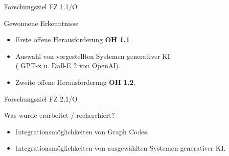 \documentclass[t]{beamer}
\begin{document}
\begin{frame}{Forschungsziel FZ 1.1/O}
  \begin{block}{Gewonnene Erkenntnisse}
    \begin{itemize}
      \item<+-> Erste offene Herausforderung \textbf{OH 1.1}.
      \item<+-> Auswahl von vorgestellten Systemen generativer KI \\
      ({\color{red} GPT-x {\color{black} u.} Dall-E 2 {\color{black} von} OpenAI}).
      \item<+-> Zweite offene Herausforderung \textbf{OH 1.2}.
    \end{itemize}
  \end{block}
\end{frame}


\begin{frame}{Forschungsziel FZ 2.1/O}
  \begin{block}{Was wurde erarbeitet / recherchiert?}
    \begin{itemize}
      \item<+-> Integrationsmöglichkeiten von Graph Codes.
      \item<+-> Integrationsmöglichkeiten von ausgewählten Systemen generativer KI.
    \end{itemize}
  \end{block}
\end{frame}
\end{document}
